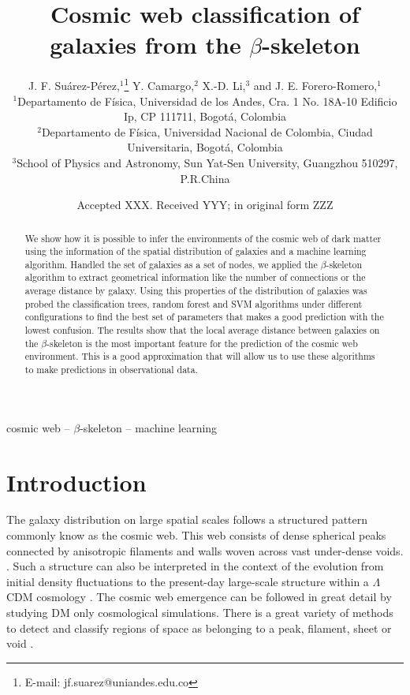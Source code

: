 \documentclass[usenatbib]{mnras}
\title[The $\beta$-skeleton and the T-web]{Cosmic web classification of galaxies from the $\beta$-skeleton}
\author[J. F. Su\'arez-P\'erez et al.]{
J. F. Su\'arez-P\'erez,$^{1}$\thanks{E-mail: jf.suarez@uniandes.edu.co}
Y. Camargo,$^{2}$ 
X.-D. Li,$^{3}$
and J. E. Forero-Romero,$^{1}$
\\
$^{1}$Departamento de F\'isica, Universidad de los Andes, Cra. 1 No. 18A-10 Edificio Ip, CP 111711, Bogot\'a, Colombia\\
$^{2}$Departamento de F\'isica, Universidad Nacional de Colombia, Ciudad Universitaria, Bogot\'a, Colombia\\
$^{3}$School of Physics and Astronomy, Sun Yat-Sen University, Guangzhou 510297, P.R.China\\
}
\date{Accepted XXX. Received YYY; in original form ZZZ}
\begin{document}
\label{firstpage}
\pagerange{\pageref{firstpage}--\pageref{lastpage}}
\maketitle

\begin{abstract}
We show how it is possible to infer the environments of the cosmic web
of dark matter using the information of the spatial distribution of
galaxies and a machine learning algorithm.
Handled the set of galaxies
as a set of nodes, we applied the $\beta$-skeleton algorithm to
extract geometrical information like the number of connections or the
average distance by galaxy.
Using this properties of the distribution
of galaxies was probed the classification trees, random forest and SVM algorithms under
different configurations to find the best set of parameters that makes
a good prediction with the lowest confusion. 
The results show that the
local average distance between galaxies on the $\beta$-skeleton is the
most important feature for the prediction of the cosmic web
environment. 
This is a good approximation that will allow us to use
these algorithms to make predictions in observational data. 
\end{abstract}

\begin{keywords}
cosmic web -- $\beta$-skeleton -- machine learning
\end{keywords}


\section{Introduction}
The galaxy distribution on large spatial scales follows a structured 
pattern commonly know as the cosmic web. 
This web consists of dense spherical peaks connected by
anisotropic filaments and walls woven across vast under-dense voids.
\citep{Bond1996}. 
Such a structure can also be interpreted in the context of 
the evolution from initial density fluctuations to the present-day 
large-scale structure within a $\Lambda$CDM cosmology \citep{ZelDovich1970,White1987}. 
The cosmic web emergence can be followed in great detail by studying DM only
cosmological simulations.
There is a great variety of methods to detect and classify regions of
space as belonging to a peak, filament, sheet or void
\citep{Libeskind2018}.
\end{document}
